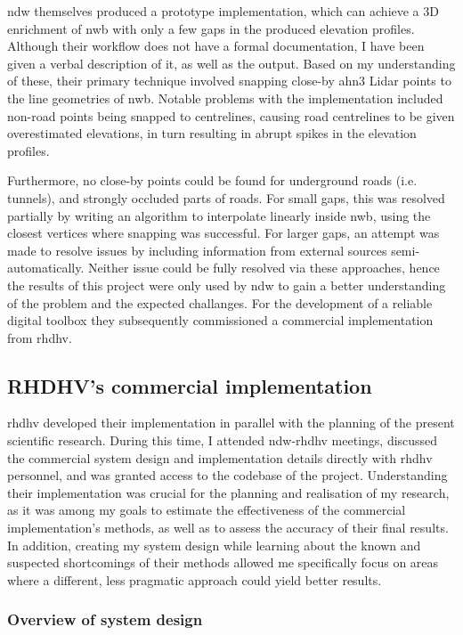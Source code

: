 \ac{ndw} themselves produced a prototype implementation, which can achieve a 3D enrichment of \ac{nwb} with only a few gaps in the produced elevation profiles. Although their workflow does not have a formal documentation, I have been given a verbal description of it, as well as the output. Based on my understanding of these, their primary technique involved snapping close-by \ac{ahn3} Lidar points to the line geometries of \ac{nwb}. Notable problems with the implementation included non-road points being snapped to centrelines, causing road centrelines to be given overestimated elevations, in turn resulting in abrupt spikes in the elevation profiles.

Furthermore, no close-by points could be found for underground roads (i.e. tunnels), and strongly occluded parts of roads. For small gaps, this was resolved partially by writing an algorithm to interpolate linearly inside \ac{nwb}, using the closest vertices where snapping was successful. For larger gaps, an attempt was made to resolve issues by including information from external sources semi-automatically. Neither issue could be fully resolved via these approaches, hence the results of this project were only used by \ac{ndw} to gain a better understanding of the problem and the expected challanges. For the development of a reliable digital toolbox they subsequently commissioned a commercial implementation from \ac{rhdhv}.

\subsection{RHDHV's commercial implementation}
\label{sub:commercialproduct}

\ac{rhdhv} developed their implementation in parallel with the planning of the present scientific research. During this time, I attended \ac{ndw}-\ac{rhdhv} meetings, discussed the commercial system design and implementation details directly with \ac{rhdhv} personnel, and was granted access to the codebase of the project. Understanding their implementation was crucial for the planning and realisation of my research, as it was among my goals to estimate the effectiveness of the commercial implementation's methods, as well as to assess the accuracy of their final results. In addition, creating my system design while learning about the known and suspected shortcomings of their methods allowed me specifically focus on areas where a different, less pragmatic approach could yield better results.

\subsubsection{Overview of system design}

